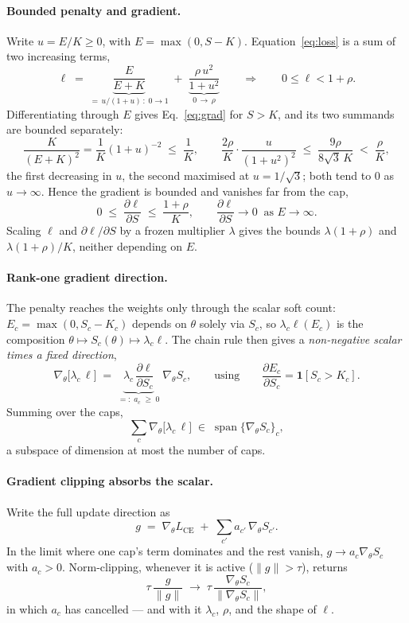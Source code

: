 \documentclass[10pt]{article}
\begin{document}
{\color{blue}
\paragraph{Bounded penalty and gradient.}
Write $u=E/K\ge 0$, with $E=\max(0,S-K)$. Equation~\eqref{eq:loss} is a sum of two
increasing terms,
\[
\ell \;=\;
\underbrace{\frac{E}{E+K}}_{=\,u/(1+u)\,:\;0\to 1}
\;+\;
\underbrace{\frac{\rho\,u^{2}}{1+u^{2}}}_{0\,\to\,\rho}
\qquad\Longrightarrow\qquad
0\le\ell<1+\rho .
\]
Differentiating through $E$ gives Eq.~\eqref{eq:grad} for $S>K$, and its two summands are
bounded separately:
\[
\frac{K}{(E+K)^{2}}=\frac{1}{K}(1+u)^{-2}\;\le\;\frac{1}{K},
\qquad
\frac{2\rho}{K}\cdot\frac{u}{(1+u^{2})^{2}}\;\le\;\frac{9\rho}{8\sqrt3\,K}\;<\;\frac{\rho}{K},
\]
the first decreasing in $u$, the second maximised at $u=1/\sqrt3$; both tend to $0$ as
$u\to\infty$. Hence the gradient is bounded and vanishes far from the cap,
\[
0\;\le\;\frac{\partial\ell}{\partial S}\;\le\;\frac{1+\rho}{K},
\qquad
\frac{\partial\ell}{\partial S}\to 0 \ \text{ as } E\to\infty .
\]
Scaling $\ell$ and $\partial\ell/\partial S$ by a frozen multiplier $\lambda$ gives the
bounds $\lambda(1+\rho)$ and $\lambda(1+\rho)/K$, neither depending on $E$.
}

{\color{blue}
\paragraph{Rank-one gradient direction.}
The penalty reaches the weights only through the scalar soft count:
$E_c=\max(0,S_c-K_c)$ depends on $\theta$ solely via $S_c$, so
$\lambda_c\ell(E_c)$ is the composition
$\theta\mapsto S_c(\theta)\mapsto\lambda_c\ell$. The chain rule then gives a
\emph{non-negative scalar times a fixed direction},
\[
\nabla_\theta\bigl[\lambda_c\,\ell\bigr]
\;=\;
\underbrace{\lambda_c\,\frac{\partial\ell}{\partial S_c}}_{=:\;a_c\;\ge\;0}
\;\nabla_\theta S_c ,
\qquad\text{using}\qquad
\frac{\partial E_c}{\partial S_c}=\mathbf 1[S_c>K_c] .
\]
Summing over the caps,
\[
\sum_c \nabla_\theta\bigl[\lambda_c\,\ell\bigr]
\;\in\;
\operatorname{span}\{\nabla_\theta S_c\}_c ,
\]
a subspace of dimension at most the number of caps.
}

{\color{blue}
\paragraph{Gradient clipping absorbs the scalar.}
Write the full update direction as
\[
g \;=\; \nabla_\theta L_{\text{CE}} \;+\; \sum_{c'} a_{c'}\,\nabla_\theta S_{c'} .
\]
In the limit where one cap's term dominates and the rest vanish, $g\to a_c\nabla_\theta S_c$
with $a_c>0$. Norm-clipping, whenever it is active ($\lVert g\rVert>\tau$), returns
\[
\tau\,\frac{g}{\lVert g\rVert}
\;\longrightarrow\;
\tau\,\frac{\nabla_\theta S_c}{\lVert\nabla_\theta S_c\rVert},
\]
in which $a_c$ has cancelled --- and with it $\lambda_c$, $\rho$, and the shape of $\ell$.
}
\end{document}
